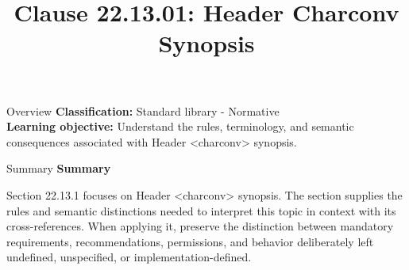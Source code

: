 \documentclass[10pt,letterpaper]{article}
\title{Clause 22.13.01: Header Charconv Synopsis}
\author{}
\date{}
\begin{document}
\maketitle
\begin{CornellOverviewBox}{Overview}
\textbf{Classification:} Standard library - Normative\\[2pt]
\textbf{Learning objective:} Understand the rules, terminology, and semantic consequences associated with Header <charconv> synopsis.
\end{CornellOverviewBox}\begin{CornellSummaryBox}{Summary}
{\sffamily\bfseries\color{Accent} Summary}\par\vspace{3pt}Section 22.13.1 focuses on Header <charconv> synopsis. The section supplies the rules and semantic distinctions needed to interpret this topic in context with its cross-references. When applying it, preserve the distinction between mandatory requirements, recommendations, permissions, and behavior deliberately left undefined, unspecified, or implementation-defined.
\end{CornellSummaryBox}
\end{document}
